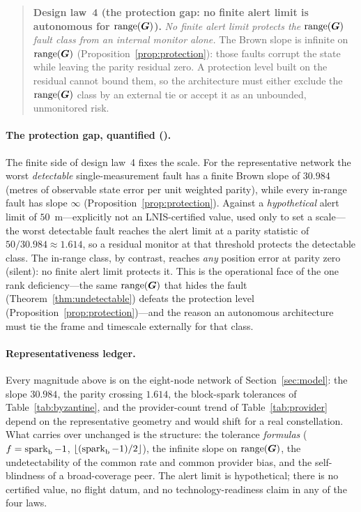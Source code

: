 \begin{quote}
\textbf{Design law~4 (the protection gap: no finite alert limit is autonomous for
$\operatorname{range}(\bm{G})$).} \emph{No finite alert limit protects the $\operatorname{range}(\bm{G})$ fault class from an
internal monitor alone.} The Brown slope is infinite on $\operatorname{range}(\bm{G})$
(Proposition~\ref{prop:protection}): those faults corrupt the state while leaving the parity
residual zero. A protection level built on the residual cannot bound them, so the architecture
must either exclude the $\operatorname{range}(\bm{G})$ class by an external tie or accept it as an unbounded,
unmonitored risk.
\end{quote}

\paragraph{The protection gap, quantified (\Modelled{}).}
The finite side of design law~4 fixes the scale. For the representative network the worst
\emph{detectable} single-measurement fault has a finite Brown slope of $30.984$ (metres of
observable state error per unit weighted parity), while every in-range fault has slope
$\infty$ (Proposition~\ref{prop:protection}). Against a \emph{hypothetical} alert limit of
$50$~m---explicitly not an LNIS-certified value, used only to set a scale---the worst
detectable fault reaches the alert limit at a parity statistic of
$50/30.984\approx1.614$, so a residual monitor at that threshold protects the detectable
class. The in-range class, by contrast, reaches \emph{any} position error at parity zero
(silent): no finite alert limit protects it. This is the operational face of the one rank
deficiency---the same $\operatorname{range}(\bm{G})$ that hides the fault (Theorem~\ref{thm:undetectable})
defeats the protection level (Proposition~\ref{prop:protection})---and the reason an
autonomous architecture must tie the frame and timescale externally for that class.

\paragraph{Representativeness ledger.}
Every magnitude above is \Modelled{} on the eight-node network of Section~\ref{sec:model}:
the slope $30.984$, the parity crossing $1.614$, the block-spark tolerances of
Table~\ref{tab:byzantine}, and the provider-count trend of Table~\ref{tab:provider} depend on
the representative geometry and would shift for a real constellation. What carries over
unchanged is the \Proven{} structure: the tolerance \emph{formulas}
($f=\operatorname{spark}_{\mathrm b}-1$, $\lfloor(\operatorname{spark}_{\mathrm b}-1)/2\rfloor$), the infinite slope on
$\operatorname{range}(\bm{G})$, the undetectability of the common rate and common provider bias, and the
self-blindness of a broad-coverage peer. The alert limit is hypothetical; there is no
certified value, no flight datum, and no technology-readiness claim in any of the four laws.
